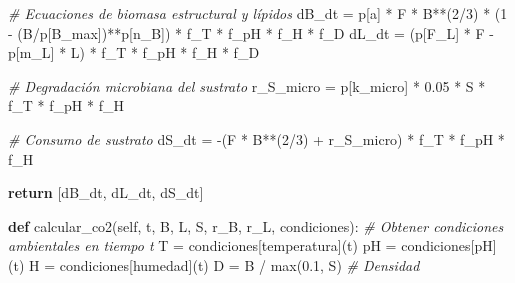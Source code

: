 \documentclass[
]{article}
\newenvironment{Shaded}{}{}
\newcommand{\BuiltInTok}[1]{\textcolor[rgb]{0.00,0.50,0.00}{#1}}
\newcommand{\CommentTok}[1]{\textcolor[rgb]{0.38,0.63,0.69}{\textit{#1}}}
\newcommand{\ControlFlowTok}[1]{\textcolor[rgb]{0.00,0.44,0.13}{\textbf{#1}}}
\newcommand{\DecValTok}[1]{\textcolor[rgb]{0.25,0.63,0.44}{#1}}
\newcommand{\FloatTok}[1]{\textcolor[rgb]{0.25,0.63,0.44}{#1}}
\newcommand{\KeywordTok}[1]{\textcolor[rgb]{0.00,0.44,0.13}{\textbf{#1}}}
\newcommand{\NormalTok}[1]{#1}
\newcommand{\OperatorTok}[1]{\textcolor[rgb]{0.40,0.40,0.40}{#1}}
\newcommand{\StringTok}[1]{\textcolor[rgb]{0.25,0.44,0.63}{#1}}
\newcommand{\VariableTok}[1]{\textcolor[rgb]{0.10,0.09,0.49}{#1}}
\begin{document}
\begin{Shaded}
\begin{Highlighting}[]
        \CommentTok{\# Ecuaciones de biomasa estructural y lípidos}
\NormalTok{        dB\_dt }\OperatorTok{=}\NormalTok{ p[}\StringTok{\textquotesingle{}a\textquotesingle{}}\NormalTok{] }\OperatorTok{*}\NormalTok{ F }\OperatorTok{*}\NormalTok{ B}\OperatorTok{**}\NormalTok{(}\DecValTok{2}\OperatorTok{/}\DecValTok{3}\NormalTok{) }\OperatorTok{*}\NormalTok{ (}\DecValTok{1} \OperatorTok{{-}}\NormalTok{ (B}\OperatorTok{/}\NormalTok{p[}\StringTok{\textquotesingle{}B\_max\textquotesingle{}}\NormalTok{])}\OperatorTok{**}\NormalTok{p[}\StringTok{\textquotesingle{}n\_B\textquotesingle{}}\NormalTok{]) }\OperatorTok{*}\NormalTok{ f\_T }\OperatorTok{*}\NormalTok{ f\_pH }\OperatorTok{*}\NormalTok{ f\_H }\OperatorTok{*}\NormalTok{ f\_D}
\NormalTok{        dL\_dt }\OperatorTok{=}\NormalTok{ (p[}\StringTok{\textquotesingle{}F\_L\textquotesingle{}}\NormalTok{] }\OperatorTok{*}\NormalTok{ F }\OperatorTok{{-}}\NormalTok{ p[}\StringTok{\textquotesingle{}m\_L\textquotesingle{}}\NormalTok{] }\OperatorTok{*}\NormalTok{ L) }\OperatorTok{*}\NormalTok{ f\_T }\OperatorTok{*}\NormalTok{ f\_pH }\OperatorTok{*}\NormalTok{ f\_H }\OperatorTok{*}\NormalTok{ f\_D}
        
        \CommentTok{\# Degradación microbiana del sustrato}
\NormalTok{        r\_S\_micro }\OperatorTok{=}\NormalTok{ p[}\StringTok{\textquotesingle{}k\_micro\textquotesingle{}}\NormalTok{] }\OperatorTok{*} \FloatTok{0.05} \OperatorTok{*}\NormalTok{ S }\OperatorTok{*}\NormalTok{ f\_T }\OperatorTok{*}\NormalTok{ f\_pH }\OperatorTok{*}\NormalTok{ f\_H}
        
        \CommentTok{\# Consumo de sustrato}
\NormalTok{        dS\_dt }\OperatorTok{=} \OperatorTok{{-}}\NormalTok{(F }\OperatorTok{*}\NormalTok{ B}\OperatorTok{**}\NormalTok{(}\DecValTok{2}\OperatorTok{/}\DecValTok{3}\NormalTok{) }\OperatorTok{+}\NormalTok{ r\_S\_micro) }\OperatorTok{*}\NormalTok{ f\_T }\OperatorTok{*}\NormalTok{ f\_pH }\OperatorTok{*}\NormalTok{ f\_H}
        
        \ControlFlowTok{return}\NormalTok{ [dB\_dt, dL\_dt, dS\_dt]}
    
    \KeywordTok{def}\NormalTok{ calcular\_co2(}\VariableTok{self}\NormalTok{, t, B, L, S, r\_B, r\_L, condiciones):}
        \CommentTok{\# Obtener condiciones ambientales en tiempo t}
\NormalTok{        T }\OperatorTok{=}\NormalTok{ condiciones[}\StringTok{\textquotesingle{}temperatura\textquotesingle{}}\NormalTok{](t)}
\NormalTok{        pH }\OperatorTok{=}\NormalTok{ condiciones[}\StringTok{\textquotesingle{}pH\textquotesingle{}}\NormalTok{](t)}
\NormalTok{        H }\OperatorTok{=}\NormalTok{ condiciones[}\StringTok{\textquotesingle{}humedad\textquotesingle{}}\NormalTok{](t)}
\NormalTok{        D }\OperatorTok{=}\NormalTok{ B }\OperatorTok{/} \BuiltInTok{max}\NormalTok{(}\FloatTok{0.1}\NormalTok{, S)  }\CommentTok{\# Densidad}
        

\end{Highlighting}
\end{Shaded}
\end{document}
